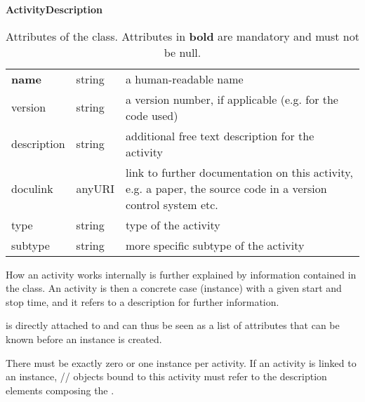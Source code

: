 \begin{table}[ht]
\small
{}\textwidth
\textbf{\normalsize ActivityDescription}\vspace{0.25em}\\
\begin{tabulary}{1.0\textwidth}{llL}
\toprule
{} &   & \\
\midrule
\textbf{name}         & string & a human-readable name\\
version      & string & a version number, if applicable (e.g. for the code used)\\
description  & string & additional free text description for the activity\\
doculink     & anyURI & link to further documentation on this activity, e.g. a 
paper, the source code in a version control system etc.\\
type        & string & type of the activity\\
subtype     & string & more specific subtype of the activity\\
\bottomrule
\end{tabulary}
\caption[Attributes of the  class]{Attributes of the  class. Attributes in \textbf{bold} are mandatory and must not be null.
}\label{tab:activitydescription}
\end{table}


How an activity works internally is further explained by information contained in the  class.
An activity is then a concrete case (instance) with a given start and stop time, and it refers to a description for further information.

 is directly attached to  and can thus be seen as a list of attributes that can be known before an  instance is created.

There must be exactly zero or one  instance per activity.
If an activity is linked to an  instance, // objects bound to this activity must refer to the description elements composing the .

